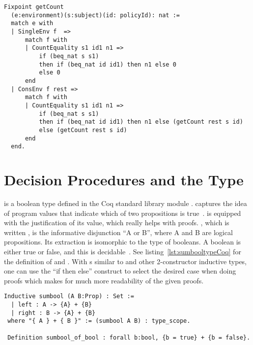 \begin{minipage}[c]{0.95\textwidth}
\begin{lstlisting}
Fixpoint getCount 
  (e:environment)(s:subject)(id: policyId): nat :=
  match e with
  | SingleEnv f  => 
      match f with 
	  | CountEquality s1 id1 n1 => 
          if (beq_nat s s1) 
          then if (beq_nat id id1) then n1 else 0 
          else 0  
      end			
  | ConsEnv f rest =>
      match f with 
	  | CountEquality s1 id1 n1 => 
          if (beq_nat s s1)
          then if (beq_nat id id1) then n1 else (getCount rest s id)  
          else (getCount rest s id)
      end
  end.
\end{lstlisting}
\end{minipage}

\section{Decision Procedures and the  Type}\label{sec:sumboolsection}

 is a boolean type defined in the Coq standard library module .  captures the idea of program values that indicate which of two propositions is true~\cite{chlipalacpdt2011}.  is equipped with the justification of its value, which really helps with proofs. , which is written , is the informative disjunction ``A or B'', where A and B are logical propositions. Its extraction is isomorphic to the type of booleans. A boolean is either true or false, and this is decidable~\cite{Coq:manual}. See listing~\ref{lst:sumbooltypeCoq} for the definition of  and . With s similar to  and other 2-constructor inductive types, one can use the ``if then else'' construct to select the desired case when doing proofs which makes for much more readability of the given proofs.

\begin{minipage}[c]{0.95\textwidth}
\begin{lstlisting}
Inductive sumbool (A B:Prop) : Set :=
  | left : A -> {A} + {B}
  | right : B -> {A} + {B}
 where "{ A } + { B }" := (sumbool A B) : type_scope.
 
 Definition sumbool_of_bool : forall b:bool, {b = true} + {b = false}.
\end{lstlisting}
\end{minipage}

